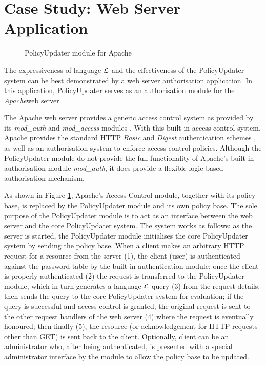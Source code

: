 \documentclass[11pt, twocolumn]{article}
\makeatletter
\newcommand{\vappsection}[1]{
  \renewcommand{\@seccntformat}[1]{
    \appendixname\hspace{0.5em}\csname the##1\endcsname \hspace{1em}
  }
  \section{#1}
  \renewcommand{\@seccntformat}[1]{
    \csname the##1\endcsname\hspace{1em}
  }
}
\makeatother
\begin{document}
  \vappsection{Case Study: Web Server Application}
    \label{app-case}

    \begin{figure}[ht]
      \begin{center}
        \caption{PolicyUpdater module for Apache}
        \label{fig-3}
      \end{center}
    \end{figure}

    The expressiveness of language $\cal{L}$ and the effectiveness of the
    PolicyUpdater system can be best demonstrated by a web server
    authorisation application. In this application, PolicyUpdater serves as
    an authorisation module for the {\em Apache}\footnotemark web server.


    The Apache web server provides a generic access control system as provided
    by its {\em mod\_auth} and {\em mod\_access} modules \cite{AP,LAU}. With
    this built-in access control system, Apache provides the standard HTTP
    {\em Basic} and {\em Digest} authentication schemes \cite{HTTP2}, as well
    as an authorisation system to enforce access control policies. Although the
    PolicyUpdater module do not provide the full functionality of Apache's
    built-in authorisation module {\em mod\_auth}, it does provide a flexible
    logic-based authorisation mechanism.

    As shown in Figure \ref{fig-3}, Apache's Access Control module, together
    with its policy base, is replaced by the PolicyUpdater module and its own
    policy base. The sole purpose of the PolicyUpdater module is to act as an
    interface between the web server and the core PolicyUpdater system. The
    system works as follows: as the server is started, the PolicyUpdater
    module initialises the core PolicyUpdater system by sending the policy
    base. When a client makes an arbitrary HTTP request for a resource from
    the server (1), the client (user) is authenticated against the password
    table by the built-in authentication module; once the client is properly
    authenticated (2) the request is transferred to the PolicyUpdater module,
    which in turn generates a language ${\cal L}$ query (3) from the request
    details, then sends the query to the core PolicyUpdater system for
    evaluation; if the query is successful and access control is granted,
    the original request is sent to the other request handlers of the web
    server (4) where the request is eventually honoured; then finally (5),
    the resource (or acknowledgement for HTTP requests other than GET) is sent
    back to the client. Optionally, client can be an administrator who,
    after being authenticated, is presented with a special administrator
    interface by the module to allow the policy base to be updated.
\end{document}
